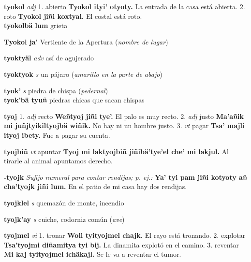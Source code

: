 \documentclass[10pt]{scrbook}
\newcommand{\entry}[1]{\textbf{#1}}
\newcommand{\onedefinition}[1]{#1.}
\newcommand{\nontranslationdef}[1]{\textit{#1}}
\newcommand{\partofspeech}[1]{\textit{#1}}
\newcommand{\spanishtranslation}[1]{#1}
\newcommand{\clarification}[1]{(\textit{#1})}
\newcommand{\cholexample}[1]{\textbf{#1}}
\newcommand{\exampletranslation}[1]{#1}
\newcommand{\secondaryentry}[1]{\\\textbf{#1}}
\newcommand{\secondtranslation}[1]{#1}
\begin{document}
\begin{multicols}{2}
\entry{tyokol}
\partofspeech{adj}
\onedefinition{1}
\spanishtranslation{abierto}
\cholexample{Tyokol ityi' otyoty.}
\exampletranslation{La entrada de la casa está abierta.}
\onedefinition{2}
\spanishtranslation{roto}
\cholexample{Tyokol jiñi koxtyal.}
\exampletranslation{El costal está roto.}
\secondaryentry{tyokolbä lum}
\secondtranslation{grieta}

\entry{Tyokol ja'}
\spanishtranslation{Vertiente de la Apertura}
\clarification{nombre de lugar}

\entry{tyoktyäl}
\partofspeech{adv}
\spanishtranslation{así de agujerado}

\entry{tyoktyok}
\partofspeech{s}
\spanishtranslation{un pájaro}
\clarification{amarillo en la parte de abajo}

\entry{tyok'}
\partofspeech{s}
\spanishtranslation{piedra de chispa}
\clarification{pedernal}
\secondaryentry{tyok'bä tyuñ}
\secondtranslation{piedras chicas que sacan chispas}

\entry{tyoj}
\onedefinition{1}
\partofspeech{adj}
\spanishtranslation{recto}
\cholexample{Weñtyoj jiñi tye'.}
\exampletranslation{El palo es muy recto.}
\onedefinition{2}
\partofspeech{adj}
\spanishtranslation{justo}
\cholexample{Ma'añik mi juñjtyikiltyojbä wiñik.}
\exampletranslation{No hay ni un hombre justo.}
\onedefinition{3}
\partofspeech{vt}
\spanishtranslation{pagar}
\cholexample{Tsa' majli ityoj ibety.}
\exampletranslation{Fue a pagar su cuenta.}

\entry{tyojbiñ}
\partofspeech{vt}
\spanishtranslation{apuntar}
\cholexample{Tyoj mi laktyojbiñ jiñibä'tye'el che' mi lakjul.}
\exampletranslation{Al tirarle al animal apuntamos derecho.}

\entry{-tyojk}
\nontranslationdef{Sufijo numeral para contar rendijas; p. ej.:}
\cholexample{Ya' tyi pam jiñi kotyoty añ cha'tyojk jiñi lum.}
\exampletranslation{En el patio de mi casa hay dos rendijas.}

\entry{tyojklel}
\partofspeech{s}
\spanishtranslation{quemazón de monte, incendio}

\entry{tyojk'ay}
\partofspeech{s}
\spanishtranslation{cuiche, codorniz común}
\clarification{ave}

\entry{tyojmel}
\partofspeech{vi}
\onedefinition{1}
\spanishtranslation{tronar}
\cholexample{Woli tyityojmel chajk.}
\exampletranslation{El rayo está tronando.}
\onedefinition{2}
\spanishtranslation{explotar}
\cholexample{Tsa'tyojmi diñamitya tyi bij.}
\exampletranslation{La dinamita explotó en el camino.}
\onedefinition{3}
\spanishtranslation{reventar}
\cholexample{Mi kaj tyityojmel ichäkajl.}
\exampletranslation{Se le va a reventar el tumor.}


\end{multicols}
\end{document}
